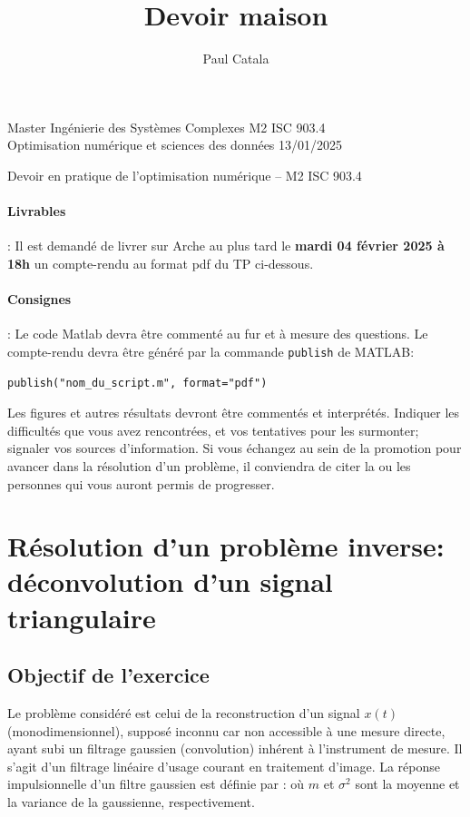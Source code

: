 \documentclass{article}
\title{Devoir maison}
\author{Paul Catala}
\begin{document}
\noindent Master Ingénierie des Systèmes Complexes \hfill M2 ISC 903.4 \\
Optimisation numérique et sciences des données \hfill 13/01/2025 


\begin{center}
\large{Devoir en pratique de l'optimisation numérique -- M2 ISC 903.4}
\end{center}

\hrulefill


\bigbreak

\paragraph{Livrables}: Il est demandé de livrer sur Arche au plus tard le \textbf{mardi 04 février 2025 à 18h} un compte-rendu au format pdf du TP ci-dessous.

\paragraph{Consignes}: Le code Matlab devra être commenté au fur et à mesure des questions. Le compte-rendu devra être généré par la commande \texttt{publish} de MATLAB:
\begin{lstlisting}
publish("nom_du_script.m", format="pdf")
\end{lstlisting}

Les figures et autres résultats devront être commentés et interprétés. Indiquer les difficultés que vous avez rencontrées, et vos tentatives pour les surmonter; signaler vos sources d'information. Si vous échangez au sein de la promotion pour avancer dans la résolution d'un problème, il conviendra de citer la ou les personnes qui vous auront permis de progresser.

\newpage

\section*{Résolution d'un problème inverse: déconvolution d'un signal triangulaire}

\subsection*{Objectif de l'exercice}
Le problème considéré est celui de la reconstruction d’un signal $x(t)$ (monodimensionnel), supposé inconnu car non accessible à une mesure directe, ayant subi un filtrage gaussien (convolution) inhérent à l’instrument de mesure. Il s’agit d’un filtrage linéaire d’usage courant en traitement d’image. La réponse impulsionnelle d’un filtre gaussien est définie par :
où $m$ et $\sigma^2$ sont la moyenne et la variance de la gaussienne, respectivement.
\end{document}

